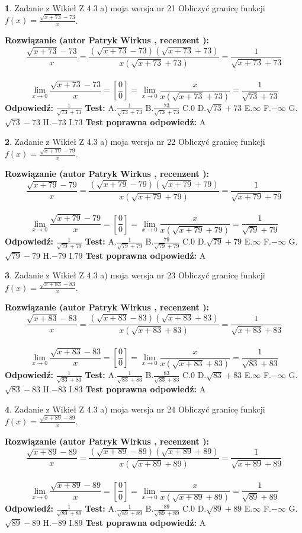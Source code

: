 \documentclass[12pt, a4paper]{article}
\theoremstyle{definition} %
\newtheorem{zad}{}
\newcommand{\zadStart}[1]{\begin{zad}#1\newline}
\newcommand{\zadStop}{\end{zad}}
\newcommand{\rozwStart}[2]{\noindent \textbf{Rozwiązanie (autor #1 , recenzent #2): }\newline}
\newcommand{\rozwStop}{\newline}
\newcommand{\odpStart}{\noindent \textbf{Odpowiedź:}\newline}
\newcommand{\odpStop}{\newline}
\newcommand{\testStart}{\noindent \textbf{Test:}\newline}
\newcommand{\testStop}{\newline}
\newcommand{\kluczStart}{\noindent \textbf{Test poprawna odpowiedź:}\newline}
\newcommand{\kluczStop}{\newline}
\begin{document}
\zadStart{Zadanie z Wikieł Z 4.3 a) moja wersja nr 21}
Obliczyć granicę funkcji $f(x)=\frac{\sqrt{x+73}-73}{x}$.
\zadStop
\rozwStart{Patryk Wirkus}{}
$$\frac{\sqrt{x+73}-73}{x}=\frac{(\sqrt{x+73}-73)(\sqrt{x+73}+73)}{x(\sqrt{x+73}+73)}=\frac{1}{\sqrt{x+73}+73}$$
\\
$$\lim\limits_{x\to0}\frac{\sqrt{x+73}-73}{x}=[\frac{0}{0}]=
\lim\limits_{x\to0}\frac{x}{x(\sqrt{x+73}+73)} = \frac{1}{\sqrt{73}+73}$$
\rozwStop
\odpStart
$\frac{1}{\sqrt{73}+73}$
\odpStop
\testStart
A.$\frac{1}{\sqrt{73}+73}$
B.$\frac{73}{\sqrt{73}+73}$
C.$0$
D.$\sqrt{73}+73$
E.$\infty$
F.$-\infty$
G.$\sqrt{73}-73$
H.$-73$
I.$73$
\testStop
\kluczStart
A
\kluczStop



\zadStart{Zadanie z Wikieł Z 4.3 a) moja wersja nr 22}
Obliczyć granicę funkcji $f(x)=\frac{\sqrt{x+79}-79}{x}$.
\zadStop
\rozwStart{Patryk Wirkus}{}
$$\frac{\sqrt{x+79}-79}{x}=\frac{(\sqrt{x+79}-79)(\sqrt{x+79}+79)}{x(\sqrt{x+79}+79)}=\frac{1}{\sqrt{x+79}+79}$$
\\
$$\lim\limits_{x\to0}\frac{\sqrt{x+79}-79}{x}=[\frac{0}{0}]=
\lim\limits_{x\to0}\frac{x}{x(\sqrt{x+79}+79)} = \frac{1}{\sqrt{79}+79}$$
\rozwStop
\odpStart
$\frac{1}{\sqrt{79}+79}$
\odpStop
\testStart
A.$\frac{1}{\sqrt{79}+79}$
B.$\frac{79}{\sqrt{79}+79}$
C.$0$
D.$\sqrt{79}+79$
E.$\infty$
F.$-\infty$
G.$\sqrt{79}-79$
H.$-79$
I.$79$
\testStop
\kluczStart
A
\kluczStop



\zadStart{Zadanie z Wikieł Z 4.3 a) moja wersja nr 23}
Obliczyć granicę funkcji $f(x)=\frac{\sqrt{x+83}-83}{x}$.
\zadStop
\rozwStart{Patryk Wirkus}{}
$$\frac{\sqrt{x+83}-83}{x}=\frac{(\sqrt{x+83}-83)(\sqrt{x+83}+83)}{x(\sqrt{x+83}+83)}=\frac{1}{\sqrt{x+83}+83}$$
\\
$$\lim\limits_{x\to0}\frac{\sqrt{x+83}-83}{x}=[\frac{0}{0}]=
\lim\limits_{x\to0}\frac{x}{x(\sqrt{x+83}+83)} = \frac{1}{\sqrt{83}+83}$$
\rozwStop
\odpStart
$\frac{1}{\sqrt{83}+83}$
\odpStop
\testStart
A.$\frac{1}{\sqrt{83}+83}$
B.$\frac{83}{\sqrt{83}+83}$
C.$0$
D.$\sqrt{83}+83$
E.$\infty$
F.$-\infty$
G.$\sqrt{83}-83$
H.$-83$
I.$83$
\testStop
\kluczStart
A
\kluczStop



\zadStart{Zadanie z Wikieł Z 4.3 a) moja wersja nr 24}
Obliczyć granicę funkcji $f(x)=\frac{\sqrt{x+89}-89}{x}$.
\zadStop
\rozwStart{Patryk Wirkus}{}
$$\frac{\sqrt{x+89}-89}{x}=\frac{(\sqrt{x+89}-89)(\sqrt{x+89}+89)}{x(\sqrt{x+89}+89)}=\frac{1}{\sqrt{x+89}+89}$$
\\
$$\lim\limits_{x\to0}\frac{\sqrt{x+89}-89}{x}=[\frac{0}{0}]=
\lim\limits_{x\to0}\frac{x}{x(\sqrt{x+89}+89)} = \frac{1}{\sqrt{89}+89}$$
\rozwStop
\odpStart
$\frac{1}{\sqrt{89}+89}$
\odpStop
\testStart
A.$\frac{1}{\sqrt{89}+89}$
B.$\frac{89}{\sqrt{89}+89}$
C.$0$
D.$\sqrt{89}+89$
E.$\infty$
F.$-\infty$
G.$\sqrt{89}-89$
H.$-89$
I.$89$
\testStop
\kluczStart
A
\kluczStop
\end{document}
